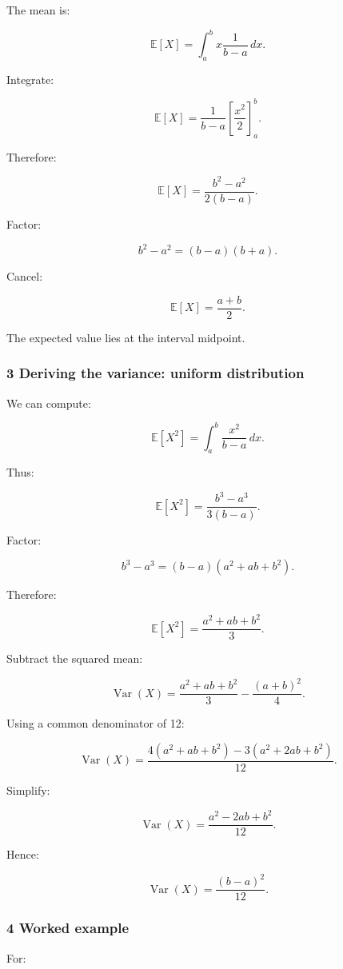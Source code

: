 \hypertarget{02-foundations-ii-ch023-deriving-the-mean-uniform-distribution}{}

The mean is:

\[
 \mathbb E[X] = \int_a^b x\frac1{b-a}\,dx.
\]

Integrate:

\[
 \mathbb E[X] = \frac1{b-a} \left[\frac{x^2}{2}\right]_a^b.
\]

Therefore:

\[
 \mathbb E[X] = \frac{b^2-a^2}{2(b-a)}.
\]

Factor:

\[
 b^2-a^2=(b-a)(b+a).
\]

Cancel:

\[
 \boxed{ \mathbb E[X]=\frac{a+b}{2} }.
\]

The expected value lies at the interval midpoint.

\subsubsection{3 Deriving the variance: uniform distribution}\label{02-foundations-ii-ch023-deriving-the-variance-uniform-distribution}

\hypertarget{02-foundations-ii-ch023-deriving-the-variance-uniform-distribution}{}

We can compute:

\[
 \mathbb E[X^2] = \int_a^b\frac{x^2}{b-a}\,dx.
\]

Thus:

\[
 \mathbb E[X^2] = \frac{b^3-a^3}{3(b-a)}.
\]

Factor:

\[
 b^3-a^3=(b-a)(a^2+ab+b^2).
\]

Therefore:

\[
 \mathbb E[X^2] = \frac{a^2+ab+b^2}{3}.
\]

Subtract the squared mean:

\[
 \operatorname{Var}(X) = \frac{a^2+ab+b^2}{3} -\frac{(a+b)^2}{4}.
\]

Using a common denominator of 12:

\[
 \operatorname{Var}(X) = \frac{ 4(a^2+ab+b^2)-3(a^2+2ab+b^2) }{12}.
\]

Simplify:

\[
 \operatorname{Var}(X) = \frac{a^2-2ab+b^2}{12}.
\]

Hence:

\[
 \boxed{ \operatorname{Var}(X)=\frac{(b-a)^2}{12} }.
\]

\begin{allmightroleexample}

\subsubsection{4 Worked example}\label{02-foundations-ii-ch023-worked-example-1}

\hypertarget{02-foundations-ii-ch023-worked-example-1}{}

For:

\end{allmightroleexample}

